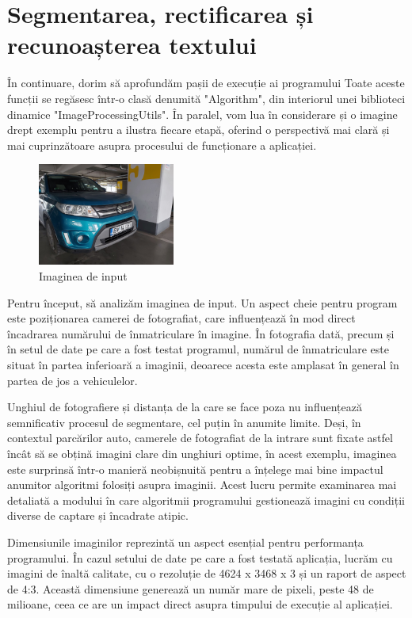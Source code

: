 \documentclass[a4paper,12pt]{report}
\begin{document}
\section{Segmentarea, rectificarea și recunoașterea textului}
În continuare, dorim să aprofundăm pașii de execuție ai programului Toate aceste funcții se regăsesc într-o clasă denumită "Algorithm", din interiorul unei biblioteci dinamice "ImageProcessingUtils". În paralel, vom lua în considerare și o imagine drept exemplu pentru a ilustra fiecare etapă, oferind o perspectivă mai clară și mai cuprinzătoare asupra procesului de funcționare a aplicației.

\begin{figure}[h]
    \centering
    \includegraphics[width=0.4\textwidth]{images/input.jpg}
    \caption{Imaginea de input}
\end{figure}
\FloatBarrier

Pentru început, să analizăm imaginea de input. Un aspect cheie pentru program este poziționarea camerei de fotografiat, care influențează în mod direct încadrarea numărului de înmatriculare în imagine. În fotografia dată, precum și în setul de date pe care a fost testat programul, numărul de înmatriculare este situat în partea inferioară a imaginii, deoarece acesta este amplasat în general în partea de jos a vehiculelor.

Unghiul de fotografiere și distanța de la care se face poza nu influențează semnificativ procesul de segmentare, cel puțin în anumite limite. Deși, în contextul parcărilor auto, camerele de fotografiat de la intrare sunt fixate astfel încât să se obțină imagini clare din unghiuri optime, în acest exemplu, imaginea este surprinsă într-o manieră neobișnuită pentru a înțelege mai bine impactul anumitor algoritmi folosiți asupra imaginii. Acest lucru permite examinarea mai detaliată a modului în care algoritmii programului gestionează imagini cu condiții diverse de captare și încadrate atipic.

Dimensiunile imaginilor reprezintă un aspect esențial pentru performanța programului. În cazul setului de date pe care a fost testată aplicația, lucrăm cu imagini de înaltă calitate, cu o rezoluție de 4624 x 3468 x 3 și un raport de aspect de 4:3. Această dimensiune generează un număr mare de pixeli, peste 48 de milioane, ceea ce are un impact direct asupra timpului de execuție al aplicației.
\end{document}
